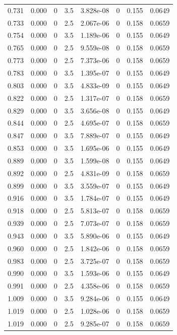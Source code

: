 \documentclass[preview]{standalone}
\begin{document}
{{{\begin{tabular}{L{1.2cm}C{1.2cm} C{0.3cm}C{0.5cm} C{1.4cm}C{1.4cm} C{1.4cm}C{1.4cm}}
  0.731  &  0.000  & 0     & 3.5 &  3.828e-08  & 0  & 0.155 &  0.0649   \\ 
  0.733  &  0.000  & 0     & 2.5 &  2.067e-06  & 0  & 0.158 &  0.0659   \\ 
  0.754  &  0.000  & 0     & 3.5 &  1.189e-06  & 0  & 0.155 &  0.0649   \\ 
  0.765  &  0.000  & 0     & 2.5 &  9.559e-08  & 0  & 0.158 &  0.0659   \\ 
  0.773  &  0.000  & 0     & 2.5 &  7.373e-06  & 0  & 0.158 &  0.0659   \\ 
  0.783  &  0.000  & 0     & 3.5 &  1.395e-07  & 0  & 0.155 &  0.0649   \\ 
  0.803  &  0.000  & 0     & 3.5 &  4.833e-09  & 0  & 0.155 &  0.0649   \\ 
  0.822  &  0.000  & 0     & 2.5 &  1.317e-07  & 0  & 0.158 &  0.0659   \\ 
  0.829  &  0.000  & 0     & 3.5 &  3.656e-08  & 0  & 0.155 &  0.0649   \\ 
  0.844  &  0.000  & 0     & 2.5 &  4.695e-07  & 0  & 0.158 &  0.0659   \\ 
  0.847  &  0.000  & 0     & 3.5 &  7.889e-07  & 0  & 0.155 &  0.0649   \\ 
  0.853  &  0.000  & 0     & 3.5 &  1.695e-06  & 0  & 0.155 &  0.0649   \\ 
  0.889  &  0.000  & 0     & 3.5 &  1.599e-08  & 0  & 0.155 &  0.0649   \\ 
  0.892  &  0.000  & 0     & 2.5 &  4.831e-09  & 0  & 0.158 &  0.0659   \\ 
  0.899  &  0.000  & 0     & 3.5 &  3.559e-07  & 0  & 0.155 &  0.0649   \\ 
  0.916  &  0.000  & 0     & 3.5 &  1.784e-07  & 0  & 0.155 &  0.0649   \\ 
  0.918  &  0.000  & 0     & 2.5 &  5.813e-07  & 0  & 0.158 &  0.0659   \\ 
  0.939  &  0.000  & 0     & 2.5 &  7.073e-07  & 0  & 0.158 &  0.0659   \\ 
  0.943  &  0.000  & 0     & 3.5 &  5.890e-06  & 0  & 0.155 &  0.0649   \\ 
  0.960  &  0.000  & 0     & 2.5 &  1.842e-06  & 0  & 0.158 &  0.0659   \\ 
  0.983  &  0.000  & 0     & 2.5 &  3.725e-07  & 0  & 0.158 &  0.0659   \\ 
  0.990  &  0.000  & 0     & 3.5 &  1.593e-06  & 0  & 0.155 &  0.0649   \\ 
  0.991  &  0.000  & 0     & 2.5 &  4.358e-06  & 0  & 0.158 &  0.0659   \\ 
  1.009  &  0.000  & 0     & 3.5 &  9.284e-06  & 0  & 0.155 &  0.0649   \\ 
  1.019  &  0.000  & 0     & 2.5 &  1.028e-06  & 0  & 0.158 &  0.0659   \\ 
  1.019  &  0.000  & 0     & 2.5 &  9.285e-07  & 0  & 0.158 &  0.0659   \\ 
\hline 
\end{tabular} 

}}}
\end{document}

